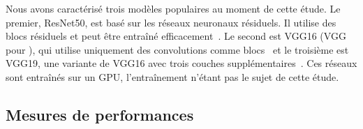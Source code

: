 \begin{table}[!ht]
    \caption{Workload characterization}
    \centering
    \label{table:herofake-tasks}
\end{table}

Nous avons caractérisé trois modèles populaires au moment de cette étude. Le premier, ResNet50, est basé sur les réseaux neuronaux résiduels. Il utilise des blocs résiduels et peut être entraîné efficacement~\cite{NEURIPS2019_7716d0fc}. Le second est VGG16 (VGG pour ), qui utilise uniquement des convolutions comme blocs~\cite{DBLP:journals/corr/SimonyanZ14a} et le troisième est VGG19, une variante de VGG16 avec trois couches supplémentaires~\cite{biom10070984}. Ces réseaux sont entraînés sur un GPU, l'entraînement n'étant pas le sujet de cette étude.

\subsection{Mesures de performances}

